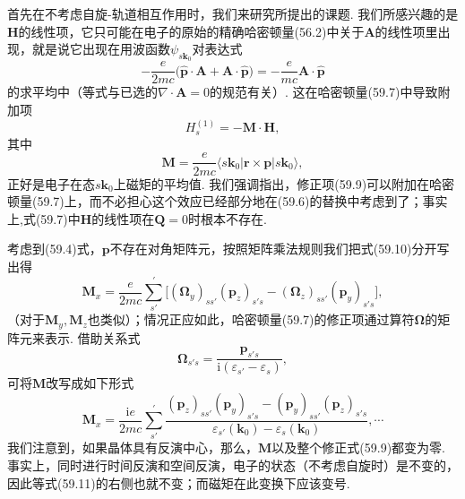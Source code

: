 首先在不考虑自旋-轨道相互作用时，我们来研究所提出的课题. 我们所感兴趣的是$\bm H$的线性项，它只可能在电子的原始的精确哈密顿量(56.2)中关于$\bm A$的线性项里出现，就是说它出现在用波函数$\psi_{s\bm k_0}$对表达式
\begin{equation}
-\frac{e}{2mc}\bigl(\hat{\bm p}\cdot\bm A+\bm A\cdot\hat{\bm p}\bigr)
=-\frac{e}{mc}\bm A\cdot\hat{\bm p}
\label{59.8}
\end{equation}
的求平均中（等式与已选的$\nabla\cdot\bm A=0$的规范有关）. 这在哈密顿量(59.7)中导致附加项
\begin{equation}
H^{(1)}_s=-\bm M\cdot\bm H,
\label{59.9}
\end{equation}
其中
\begin{equation}
\bm M=\frac{e}{2mc}\bigl\langle s\bm k_0|\bm r\times\bm p|s\bm k_0\bigr\rangle,
\label{59.10}
\end{equation}
正好是电子在态$s\bm k_0$上磁矩的平均值. 我们强调指出，修正项(59.9)可以附加在哈密顿量(59.7)上，而不必担心这个效应已经部分地在(59.6)的替换中考虑到了；事实上,式(59.7)中$\bm H$的线性项在$\bm Q=0$时根本不存在.

考虑到(59.4)式，$\bm p$不存在对角矩阵元，按照矩阵乘法规则我们把式(59.10)分开写出得
\begin{equation*}
\bm M_x=\frac{e}{2mc}\sum_{s'}^{\prime}
\bigl[(\bm\Omega_y)_{ss'}(\bm p_z)_{s's}-(\bm\Omega_z)_{ss'}(\bm p_y)_{s's}\bigr],
\end{equation*}
（对于$\bm M_y,\bm M_z$也类似）；情况正应如此，哈密顿量(59.7)的修正项通过算符$\bm\Omega$的矩阵元来表示. 借助关系式
\begin{equation*}
\bm\Omega_{s's}=\frac{\bm p_{s's}}{\mathrm i(\varepsilon_{s'}-\varepsilon_s)},
\end{equation*}
可将$\bm M$改写成如下形式
\begin{equation}
\bm M_x=\frac{\mathrm ie}{2mc}\sum_{s'}^{\prime}
\frac{(\bm p_z)_{ss'}(\bm p_y)_{s's}-(\bm p_y)_{ss'}(\bm p_z)_{s's}}
{\varepsilon_{s'}(\bm k_0)-\varepsilon_s(\bm k_0)},\cdots
\label{59.11}
\end{equation}
我们注意到，如果晶体具有反演中心，那么，$\bm M$以及整个修正式(59.9)都变为零. 事实上，同时进行时间反演和空间反演，电子的状态（不考虑自旋时）是不变的，因此等式(59.11)的右侧也就不变；而磁矩在此变换下应该变号.

